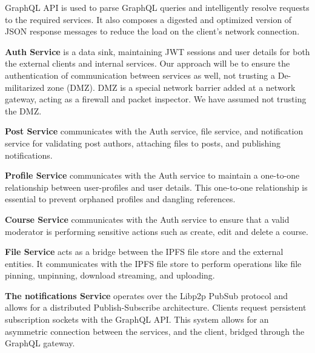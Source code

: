 GraphQL API is used to parse GraphQL queries and intelligently resolve requests to the required services. 
It also composes a digested and optimized version of JSON response messages to reduce the load on the client's network connection.

\textbf{Auth Service} is a data sink, maintaining JWT sessions and user details for both the external clients and internal services. 
Our approach will be to ensure the authentication of communication between services as well, not trusting a De-militarized zone (DMZ).
DMZ is a special network barrier added at a network gateway, acting as a firewall and packet inspector. We have assumed not trusting 
the DMZ.

\textbf{Post Service} communicates with the Auth service, file service, and notification service for validating post authors, attaching files to posts, 
and publishing notifications.

\textbf{Profile Service} communicates with the Auth service to maintain a one-to-one relationship between user-profiles and user details. 
This one-to-one relationship is essential to prevent orphaned profiles and dangling references.

\textbf{Course Service} communicates with the Auth service to ensure that a valid moderator is performing sensitive actions such as create, edit and delete a course. 

\textbf{File Service} acts as a bridge between the IPFS file store and the external entities. 
It communicates with the IPFS file store to perform operations like file pinning, unpinning, download streaming, and uploading.

\textbf{The notifications Service} operates over the Libp2p PubSub protocol and allows for a distributed Publish-Subscribe architecture. 
Clients request persistent subscription sockets with the GraphQL API. This system allows for an asymmetric connection between 
the services, and the client, bridged through the GraphQL gateway.